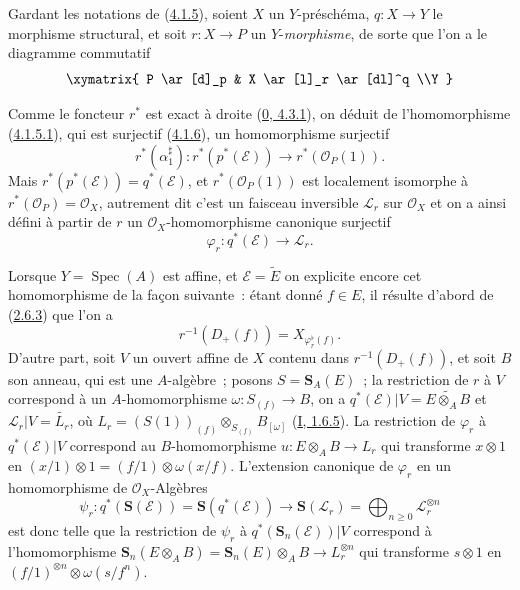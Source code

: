 \begin{env}[4.2.1]
\label{II.4.2.1-fr}
Gardant les notations de (\hyperref[II.4.1.5-fr]{4.1.5}), soient $X$ un
$Y$-préschéma, $q:X\to Y$ le morphisme structural, et soit $r:X\to P$ un
$Y$-\emph{morphisme}, de sorte que l'on a le diagramme commutatif
\[
  \xymatrix{
    P \ar[d]_p & X \ar[l]_r \ar[dl]^q
    \\Y
  }
\]


Comme le foncteur $r^*$ est exact à droite
(\hyperref[0.4.3.1-fr]{0, 4.3.1}), on déduit de l'homomorphisme
(\hyperref[II.4.1.5.1-fr]{4.1.5.1}), qui est surjectif
(\hyperref[II.4.1.6-fr]{4.1.6}), un homomorphisme surjectif
\[
  r^*(\alpha_1^\sharp):r^*(p^*(\mathcal{E}))\longrightarrow
  r^*(\mathcal{O}_P(1)).
\]
Mais $r^*(p^*(\mathcal{E}))=q^*(\mathcal{E})$, et
$r^*(\mathcal{O}_P(1))$ est localement isomorphe à
$r^*(\mathcal{O}_P)=\mathcal{O}_X$, autrement dit c'est un faisceau
inversible $\mathcal{L}_r$ sur $\mathcal{O}_X$ et on a ainsi défini à partir
de $r$ un $\mathcal{O}_X$-homomorphisme canonique surjectif
\[
\label{II.4.2.1.1-fr}
  \varphi_r:q^*(\mathcal{E})\longrightarrow\mathcal{L}_r.
\tag{4.2.1.1}
\]

Lorsque $Y=\operatorname{Spec}(A)$ est affine, et
$\mathcal{E}=\widetilde{E}$ on explicite encore cet homomorphisme de la façon
suivante~: étant donné $f\in E$, il résulte d'abord de
(\hyperref[II.2.6.3-fr]{2.6.3}) que l'on a
\[
\label{II.4.2.1.2-fr}
  r^{-1}(D_+(f))=X_{\varphi_r^\flat(f)}.
\tag{4.2.1.2}
\]
D'autre part, soit $V$ un ouvert affine de $X$ contenu dans
$r^{-1}(D_+(f))$, et soit $B$ son anneau, qui est une $A$-algèbre~; posons
$S=\mathbf{S}_A(E)$~; la restriction de $r$ à $V$ correspond à un
$A$-homomorphisme $\omega:S_{(f)}\to B$, on a
$q^*(\mathcal{E})|V=\widetilde{E\otimes_A B}$ et
$\mathcal{L}_r|V=\widetilde{L_r}$, où
$L_r=(S(1))_{(f)}\otimes_{S_{(f)}}B_{[\omega]}$
(\hyperref[I.1.6.5-fr]{I, 1.6.5}). La restriction de $\varphi_r$ à
$q^*(\mathcal{E})|V$ correspond au $B$-homomorphisme
$u:E\otimes_A B\to L_r$ qui transforme $x\otimes1$ en
$(x/1)\otimes1=(f/1)\otimes\omega(x/f)$. L'extension canonique de
$\varphi_r$ en un homomorphisme de $\mathcal{O}_X$-Algèbres
\[
  \psi_r:q^*(\mathbf{S}(\mathcal{E}))=
  \mathbf{S}(q^*(\mathcal{E}))\longrightarrow
  \mathbf{S}(\mathcal{L}_r)=\bigoplus_{n\geq0}\mathcal{L}_r^{\otimes n}
\]
est donc telle que la restriction de $\psi_r$ à
$q^*(\mathbf{S}_n(\mathcal{E}))|V$ correspond à l'homomorphisme
$\mathbf{S}_n(E\otimes_A B)=\mathbf{S}_n(E)\otimes_A B\to L_r^{\otimes n}$
qui transforme $s\otimes1$ en
$(f/1)^{\otimes n}\otimes\omega(s/f^n)$.
\end{env}

